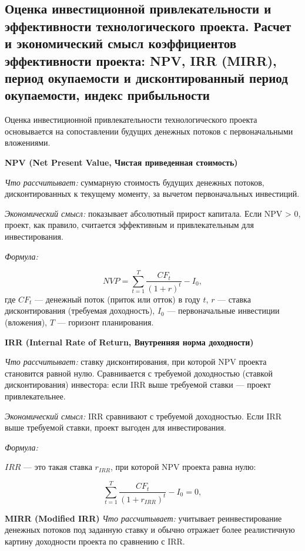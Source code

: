 \subsection{Оценка инвестиционной привлекательности и эффективности технологического проекта. Расчет и экономический смысл коэффициентов эффективности проекта: NPV, IRR (MIRR), период окупаемости и дисконтированный период окупаемости, индекс прибыльности}

Оценка инвестиционной привлекательности технологического проекта основывается на сопоставлении будущих денежных потоков с первоначальными вложениями. 

\textbf{NPV (Net Present Value, Чистая приведенная стоимость)}

\textit{Что рассчитывает:} суммарную стоимость будущих денежных потоков, дисконтированных к текущему моменту, за вычетом первоначальных инвестиций.

\textit{Экономический смысл:} показывает абсолютный прирост капитала. Если NPV > 0, проект, как правило, считается эффективным и привлекательным для инвестирования.

\textit{Формула:}

\begin{equation}
    NVP = \sum \limits_{t=1} ^T \frac{CF_t}{(1+r)^t} - I_0,
\end{equation}
\noindent где
$CF_t$ --- денежный поток (приток или отток) в году $t$,
$r$ --- ставка дисконтирования (требуемая доходность),
$I_0$ --- первоначальные инвестиции (вложения),
$T$ --- горизонт планирования.


\textbf{IRR (Internal Rate of Return, Внутренняя норма доходности)}

\textit{Что рассчитывает:} ставку дисконтирования, при которой NPV проекта становится равной нулю. Сравнивается с требуемой доходностью (ставкой дисконтирования) инвестора: если IRR выше требуемой ставки --- проект привлекательнее.

\textit{Экономический смысл:} IRR сравнивают с требуемой доходностью. Если IRR выше требуемой ставки, проект выгоден для инвестирования.

\textit{Формула:}

$IRR$ --- это такая ставка $r_{IRR}$, при которой NPV проекта равна нулю:

\begin{equation}
    \sum \limits_{t=1} ^T \frac{CF_t}{(1+r_{IRR})^t} - I_0 = 0,
\end{equation}

\textbf{MIRR (Modified IRR)}
\textit{Что рассчитывает:} учитывает реинвестирование денежных потоков под заданную ставку и обычно отражает более реалистичную картину доходности проекта по сравнению с IRR.


